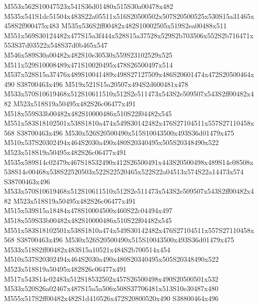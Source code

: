 \documentclass{article}
\begin{document}
\begin{multicols}{2}





M553x562S10047523x541S36d01480x515S30a00478x482 M535x541S1dc51504x483S22a05511x516S20500502x507S20500525x530S15a31465x458S2f900475x483 M535x536S2ff00482x482S10002505x519S2ea00488x511 M551x569S30124482x477S15a3f444x528S15a37528x529S2b703506x552S2b716471x553S37d03522x548S37d0b465x547 M546x589S30a00482x482S10e30530x559S23102529x525 M511x529S10008489x471S10020495x478S26500497x514 M537x528S15a37476x489S10041489x498S27127509x486S20601474x472S20500464x490 S38700463x496 M519x521S15a20507x494S2d600481x478 M533x570S10619468x512S10611510x512S2e511473x543S2e509507x543S2ff00482x482 M523x518S19a50495x482S26c06477x491 M518x559S33b00482x482S10000486x510S22f04482x545 M551x583S18102501x538S1810a474x549S30142482x476S27104511x557S27110458x568 S38700463x496 M530x526S20500490x515S10043500x493S36d01479x475 M510x537S20302494x464S2030a490x480S20340495x505S20348490x522 M523x518S19a50495x482S26c06477x491 M535x589S14c02479x467S18532490x412S26500491x443S20500498x489S14c08508x538S14c00468x538S22520503x522S22520465x522S22a04513x574S22a14473x574 S38700463x496 M533x570S10619468x512S10611510x512S2e511473x543S2e509507x543S2ff00482x482 M523x518S19a50495x482S26c06477x491 M515x539S15a18484x478S10004500x460S22c04494x497 M518x559S33b00482x482S10000486x510S22f04482x545 M551x583S18102501x538S1810a474x549S30142482x476S27104511x557S27110458x568 S38700463x496 M530x526S20500490x515S10043500x493S36d01479x475 M533x518S2ff00482x483S15a10521x484S2b700514x454 M510x537S20302494x464S2030a490x480S20340495x505S20348490x522 M523x518S19a50495x482S26c06477x491 M517x543S14c02483x512S18532502x457S26500498x490S20500501x532 M533x520S26a02467x487S15a5a506x508S37706481x513S10e30487x480 M555x517S2ff00482x482S1d410526x472S20800520x490 S38800464x496


\end{multicols}
\end{document}
